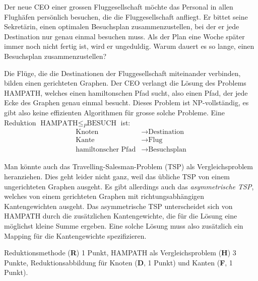 Der neue CEO einer grossen Fluggesellschaft möchte das Personal in allen
Flughäfen persönlich besuchen, die die Fluggesellschaft anfliegt.
Er bittet seine Sekretärin, einen optimalen Besuchsplan zusammenzustellen,
bei der er jede Destination nur genau einmal besuchen muss.
Als der Plan eine Woche später immer noch nicht fertig ist, wird er
ungeduldig.
Warum dauert es so lange, einen Besuchsplan zusammenzustellen?


\begin{loesung}
Die Flüge, die die Destinationen der Fluggesellschaft miteinander
verbinden, bilden einen gerichteten Graphen.
Der CEO verlangt die Lösung des Problems HAMPATH, welches einen
hamiltonschen Pfad sucht, also einen Pfad, der jede Ecke des Graphen
genau einmal besucht.
Dieses Problem ist NP-vollständig, es gibt also keine effizienten
Algorithmen für grosse solche Probleme.
Eine Reduktion $\text{HAMPATH}\le_P\text{BESUCH}$ ist:
\begin{align*}
\text{Knoten}    & \to \text{Destination}\\
\text{Kante}     & \to \text{Flug} \\
\text{hamiltonscher Pfad}&\to\text{Besuchsplan}
\end{align*}
\end{loesung}

\begin{diskussion}
Man könnte auch das Travelling-Salesman-Problem (TSP) als Vergleichsproblem
heranziehen.
Dies geht leider nicht ganz, weil das übliche TSP von einem ungerichteten
Graphen ausgeht.
Es gibt allerdings auch das {\em asymmetrische TSP}, welches von einem 
gerichteten Graphen mit richtungsabhängigen Kantengewichten ausgeht.
Das asymmetrische TSP unterscheidet sich von HAMPATH durch die
zusätzlichen Kantengewichte, die für die Lösung eine möglichst
kleine Summe ergeben.
Eine solche Lösung muss also zusätzlich ein Mapping für die
Kantengewichte spezifizieren.
\end{diskussion}

\begin{bewertung}
Reduktionsmethode ({\bf R}) 1 Punkt,
HAMPATH als Vergleichsproblem ({\bf H}) 3 Punkte,
Reduktionsabbildung für Knoten ({\bf D}, 1 Punkt) und Kanten
({\bf F}, 1 Punkt).
\end{bewertung}

